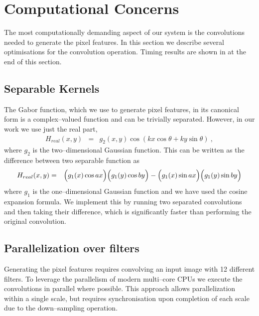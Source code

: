 \section{Computational Concerns}
The most computationally demanding aspect of our system is the
convolutions needed to generate the pixel features. In this section we
describe several optimisations for the convolution operation. Timing
results are shown in  at the end of this
section.

\subsection{Separable Kernels}
The Gabor function, which we use to generate pixel features, in its
canonical form is a complex--valued function and can be trivially
separated. However, in our work we use just the real part,
\begin{eqnarray}
  H_{real}(x,y) & = & g_2(x,y) \cos(kx\cos\theta + ky\sin\theta) ~,
\end{eqnarray}
where $g_2$ is the two--dimensional Gaussian
function. This can be written as the difference between two separable
function as
\begin{eqnarray}
   H_{real}(x,y) & = & \Bigl(g_1(x)\cos ax\Bigr) \Bigl(g_1(y)\cos by\Bigr)
      - \Bigl(g_1(x)\sin ax\Bigr)\Bigl(g_1(y)\sin by\Bigr)
\end{eqnarray}
where $g_1$ is the one--dimensional Gaussian function and we have used
the cosine expansion formula. We implement this by running two
separated convolutions and then taking their difference, which is
significantly faster than performing the original convolution.

\subsection{Parallelization over filters}
Generating the pixel features requires convolving an input image with
12 different filters. To leverage the parallelism of
modern multi--core CPUs we execute the convolutions in parallel where
possible. This approach allows parallelization within a single scale,
but requires synchronisation upon completion of each scale due to the
down--sampling operation.

